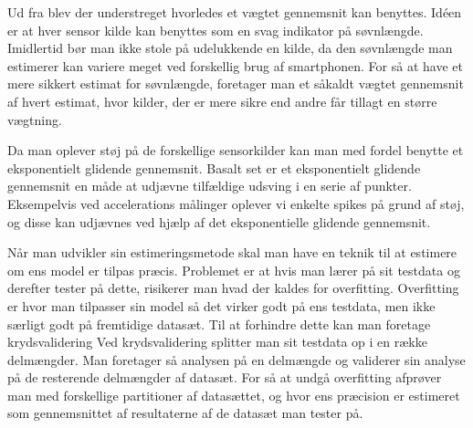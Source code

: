 \begin{description}[style=nextline]
\item[Vægtet gennemsnit]
Ud fra \citet{6563918} blev der understreget hvorledes et vægtet gennemsnit kan benyttes.
Idéen er at hver sensor kilde kan benyttes som en svag indikator på søvnlængde.
Imidlertid bør man ikke stole på udelukkende en kilde, da den søvnlængde man estimerer kan variere meget ved forskellig brug af smartphonen.
For så at have et mere sikkert estimat for søvnlængde, foretager man et såkaldt vægtet gennemsnit af hvert estimat, hvor kilder, der er mere sikre end andre får tillagt en større vægtning.

\item[Eksponentielt glidende gennemsnit]
Da man oplever støj på de forskellige sensorkilder kan man med fordel benytte et eksponentielt glidende gennemsnit.
Basalt set er et eksponentielt glidende gennemsnit en måde at udjævne tilfældige udsving i en serie af punkter.
Eksempelvis ved accelerations målinger oplever vi enkelte spikes på grund af støj, og disse kan udjævnes ved hjælp af det eksponentielle glidende gennemsnit.

\item[Krydsvalidering]
Når man udvikler sin estimeringsmetode skal man have en teknik til at estimere om ens model er tilpas præcis.
Problemet er at hvis man lærer på sit testdata og derefter tester på dette, risikerer man hvad der kaldes for overfitting.
Overfitting er hvor man tilpasser sin model så det virker godt på ens testdata, men ikke særligt godt på fremtidige datasæt.
Til at forhindre dette kan man foretage krydsvalidering
Ved krydsvalidering splitter man sit testdata op i en række delmængder.
Man foretager så analysen på en delmængde og validerer sin analyse på de resterende delmængder af datasæt.
For så at undgå overfitting afprøver man med forskellige partitioner af datasættet, og hvor ens præcision er estimeret som gennemsnittet af resultaterne af de datasæt man tester på.

\end{description}